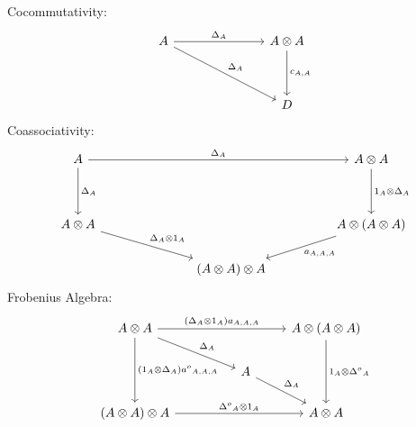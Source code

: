 \documentclass[11pt, oneside]{amsart}
\theoremstyle{definition}
\theoremstyle{definition}
\begin{document}
Cocommutativity:
\begin{equation*}
\begin{tikzcd}
A \arrow[rrr, "\Delta_{A}"] \arrow[rrrdd, "\Delta_{A}"] &  &  & A\otimes{A} \arrow[dd, "{c_{A, A}}"] \\
                                                        &  &  &                                     \\
                                                        &  &  & D                                  
\end{tikzcd}
\end{equation*}
Coassociativity:
\begin{equation*}
\begin{tikzcd}
A \arrow[rrrrr, "\Delta_{A}"] \arrow[dd, "\Delta_A"] &  &  &                         &  & A\otimes{A} \arrow[dd, "1_{A}\otimes{\Delta_{A}}"] \\
                                                     &  &  &                         &  &                                                    \\
A\otimes{A} \arrow[rrrd, "{\Delta_A}\otimes{1_A}"]   &  &  &                         &  & A\otimes(A\otimes{A)} \arrow[lld, "{a_{A, A, A}}"] \\
                                                     &  &  & (A\otimes{A})\otimes{A} &  &                                                   
\end{tikzcd}
\end{equation*}
Frobenius Algebra:
\begin{equation*}
\begin{tikzcd}
A\otimes{A} \arrow[rrr, "{(\Delta_{A}\otimes{1_{A}})a_{A,A,A}}"] \arrow[dd, "{(1_{A}\otimes{\Delta_{A}}){a^o}_{A,A,A}}"] \arrow[rrd, "{\Delta_{A}}"] &  &                            & {A}\otimes({A}\otimes{A}) \arrow[dd, "1_{A}\otimes{\Delta{^o}_{A}}"] \\
                                                                                                                                                     &  & A \arrow[rd, "\Delta_{A}"] &                                                                      \\
({A}\otimes{A})\otimes{A} \arrow[rrr, "{\Delta{^o}_{A}}\otimes1_{A}"]                                                                                &  &                            & {A}\otimes{A}                                                       
\end{tikzcd}
\end{equation*}
\end{document}
